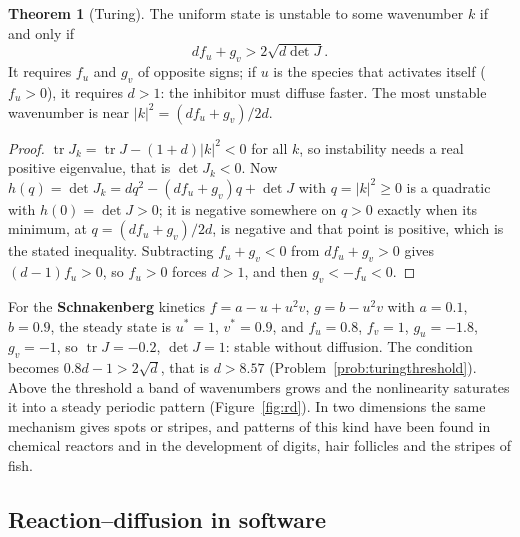 \documentclass[11pt,a4paper]{article}
\numberwithin{equation}{section}
\theoremstyle{definition}
\newtheorem{thm}{Theorem}[subsection]
\begin{document}
\begin{thm}[Turing]
\label{thm:turing}
The uniform state is unstable to some wavenumber $k$ if and only if
\[
df_u + g_v > 2\sqrt{d\det J} .
\]
It requires $f_u$ and $g_v$ of opposite signs; if $u$ is the species that activates itself ($f_u > 0$), it requires $d > 1$: the inhibitor must diffuse faster. The most unstable wavenumber is near $|k|^2 = (df_u + g_v)/2d$.
\end{thm}

\begin{proof}
$\operatorname{tr}J_k = \operatorname{tr}J - (1 + d)|k|^2 < 0$ for all $k$, so instability needs a real positive eigenvalue, that is $\det J_k < 0$. Now $h(q) = \det J_k = dq^2 - (df_u + g_v)q + \det J$ with $q = |k|^2 \geq 0$ is a quadratic with $h(0) = \det J > 0$; it is negative somewhere on $q > 0$ exactly when its minimum, at
$q = (df_u + g_v)/2d$, is negative and that point is positive, which is the stated inequality. Subtracting $f_u + g_v < 0$ from $df_u + g_v > 0$ gives $(d - 1)f_u > 0$, so $f_u > 0$ forces $d > 1$, and then $g_v < -f_u < 0$.
\end{proof}

For the \textbf{Schnakenberg} kinetics $f = a - u + u^2v$, $g = b - u^2v$ with $a = 0.1$, $b = 0.9$, the steady state is $u^* = 1$, $v^* = 0.9$, and $f_u = 0.8$, $f_v = 1$, $g_u = -1.8$, $g_v = -1$, so $\operatorname{tr}J = -0.2$, $\det J = 1$: stable without diffusion. The condition becomes
$0.8d - 1 > 2\sqrt d$, that is $d > 8.57$ (Problem~\ref{prob:turingthreshold}). Above the threshold a band of wavenumbers grows and the nonlinearity saturates it into a steady periodic pattern (Figure~\ref{fig:rd}). In two dimensions the same mechanism gives spots or stripes, and patterns of this kind have been found in
chemical reactors and in the development of digits, hair follicles and the stripes of fish.

\subsection{Reaction--diffusion in software}
\label{ssec:software14}
\end{document}

